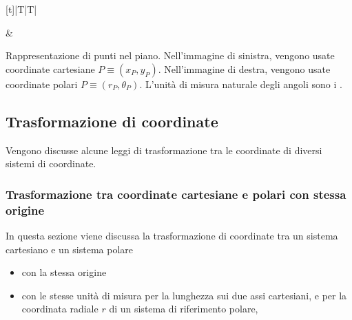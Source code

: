 \documentclass[letterpaper,10pt,italian]{jupyterBook}
\begin{document}
\begin{savenotes}\sphinxattablestart
\centering
\begin{tabulary}{\linewidth}[t]{|T|T|}
\hline

\sphinxAtStartPar
{}
&
\sphinxAtStartPar
{}
\\
\hline
\end{tabulary}
\par
\sphinxattableend\end{savenotes}

\sphinxAtStartPar
Rappresentazione di punti nel piano. Nell’immagine di sinistra, vengono usate coordinate cartesiane \(P \equiv (x_P, y_P)\). Nell’immagine di destra, vengono usate coordinate polari \(P \equiv (r_P, \theta_P)\). L’unità di misura naturale degli angoli sono i .


\subsection{Trasformazione di coordinate}
\label{\detokenize{ch/analytic_geometry/analytic_geometry_2d/coordinates:trasformazione-di-coordinate}}\label{\detokenize{ch/analytic_geometry/analytic_geometry_2d/coordinates:geometry-analytic-2d-coordinates-transform}}
\sphinxAtStartPar
Vengono discusse alcune leggi di trasformazione tra le coordinate di diversi sistemi di coordinate.






\subsubsection{Trasformazione tra coordinate cartesiane e polari con stessa origine}
\label{\detokenize{ch/analytic_geometry/analytic_geometry_2d/coordinates:trasformazione-tra-coordinate-cartesiane-e-polari-con-stessa-origine}}\label{\detokenize{ch/analytic_geometry/analytic_geometry_2d/coordinates:geometry-analytic-2d-coordinates-transform-cartesian-polar}}
\sphinxAtStartPar
In questa sezione viene discussa la trasformazione di coordinate tra un sistema cartesiano e un sistema polare
\begin{itemize}
\item {} 
\sphinxAtStartPar
con la stessa origine

\item {} 
\sphinxAtStartPar
con le stesse unità di misura per la lunghezza sui due assi cartesiani, e per la coordinata radiale \(r\) di un sistema di riferimento polare,

\end{itemize}
\end{document}
